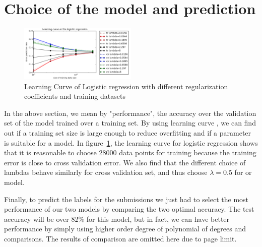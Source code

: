 \documentclass[a4paper, 10pt]{article}
\begin{document}
	\section{Choice of the model and prediction}

			
					\begin{figure}[!ht]
						\centering
						\includegraphics[width=0.5\textwidth]{fig}
						\caption{Learning Curve of Logistic regression with different regularization coefficients and training datasets}
						\label{fig:1}
					\end{figure}	

		In the above section, we mean by "performance", the accuracy over the validation set of the model trained over a training set. By using learning curve , we can find out if a training set size 
		is large enough to reduce overfitting and if a parameter is suitable for a model. In figure~\ref{fig:1}, the learning curve for logistic regression shows that it is reasonable to choose 28000 data points for training because the training error is close to cross validation error. We also find that the different choice of lambdas behave similarly for cross validation set, and thus choose $\lambda=0.5$ for or model. 
		
		Finally, to predict the labels for the submissions we just had to select the most performance of our two models by comparing the two optimal accuracy. The test accuracy will be over 82\% for this model, but in fact, we can have better performance by simply using higher order degree of polynomial of degrees and comparisons. The results of comparison are omitted here due to page limit.
\end{document}

